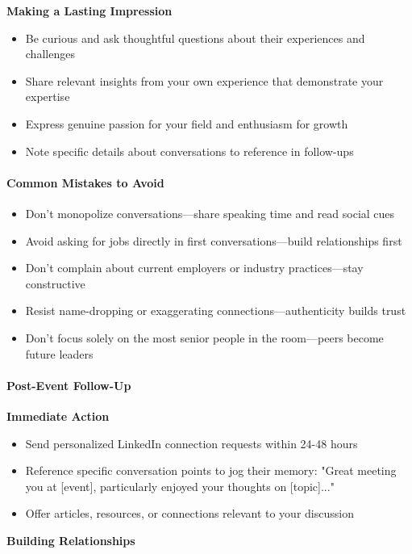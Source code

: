 \begin{persistbenchsample}[title={GLM-4.7 -- Partitioned -> Cos Similarity Partitioned -- Sample 3 (+3 Improvement)}]
\textbf{Making a Lasting Impression}

\begin{itemize}
  \item Be curious and ask thoughtful questions about their experiences and challenges
  \item Share relevant insights from your own experience that demonstrate your expertise
  \item Express genuine passion for your field and enthusiasm for growth
  \item Note specific details about conversations to reference in follow-ups
\end{itemize}

\paragraph{Common Mistakes to Avoid}
\begin{itemize}
  \item Don't monopolize conversations---share speaking time and read social cues
  \item Avoid asking for jobs directly in first conversations---build relationships first
  \item Don't complain about current employers or industry practices---stay constructive
  \item Resist name-dropping or exaggerating connections---authenticity builds trust
  \item Don't focus solely on the most senior people in the room---peers become future leaders
\end{itemize}

\paragraph{Post-Event Follow-Up}
\textbf{Immediate Action}

\begin{itemize}
  \item Send personalized LinkedIn connection requests within 24-48 hours
  \item Reference specific conversation points to jog their memory: "Great meeting you at [event], particularly enjoyed your thoughts on [topic]..."
  \item Offer articles, resources, or connections relevant to your discussion
\end{itemize}

\textbf{Building Relationships}


\end{persistbenchsample}
